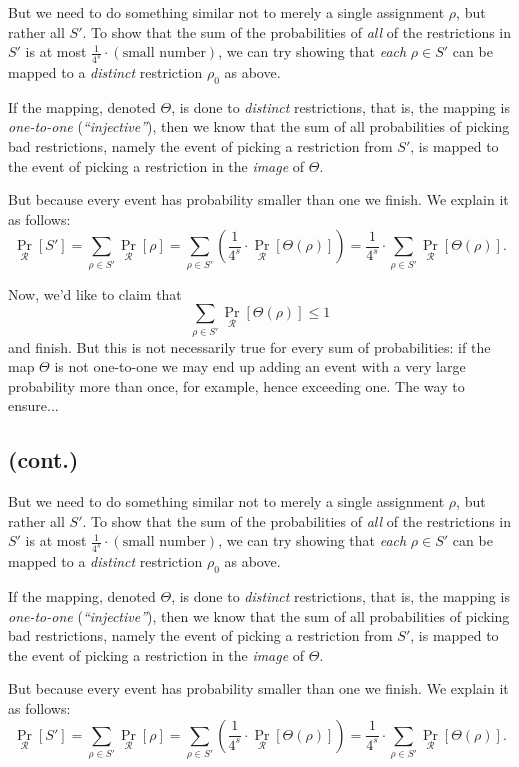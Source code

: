 But we need to do something similar not to merely a single assignment \( \rho \), but rather all \( S' \).
To show that the sum of the probabilities of \emph{all} of the restrictions in \( S' \) is at most 
\(\frac{1}{4^s} \cdot (\text{small number})\), we can try showing that \emph{each} \( \rho \in S' \) can be mapped to a 
\emph{distinct} restriction \( \rho_0 \) as above. 

If the mapping, denoted \( \Theta \), is done to \emph{distinct} restrictions, that is, the mapping is 
\emph{one-to-one} (\emph{``injective''}), then we know that the sum of all probabilities of picking bad restrictions, 
namely the event of picking a restriction from \( S' \), is mapped to the event of picking a restriction in the 
\emph{image} of \( \Theta \).

But because every event has probability smaller than one we finish. We explain it as follows:
\[
\Pr_{\mathcal{R}}[S'] = \sum_{\rho \in S'} \Pr_{\mathcal{R}}[\rho] = 
\sum_{\rho \in S'} \left(\frac{1}{4^s} \cdot \Pr_{\mathcal{R}}[\Theta(\rho)]\right) =
\frac{1}{4^s} \cdot \sum_{\rho \in S'} \Pr_{\mathcal{R}}[\Theta(\rho)].
\]

Now, we'd like to claim that 
\[
\sum_{\rho \in S'} \Pr_{\mathcal{R}}[\Theta(\rho)] \leq 1
\]
and finish. But this is not necessarily true for every sum of probabilities: if the map \( \Theta \) is 
not one-to-one we may end up adding an event with a very large probability more than once, for example, 
hence exceeding one. The way to ensure...
\subsection*{(cont.)}

But we need to do something similar not to merely a single assignment \( \rho \), but rather all \( S' \).
To show that the sum of the probabilities of \emph{all} of the restrictions in \( S' \) is at most 
\(\frac{1}{4^s} \cdot (\text{small number})\), we can try showing that \emph{each} \( \rho \in S' \) can be mapped to a 
\emph{distinct} restriction \( \rho_0 \) as above. 

If the mapping, denoted \( \Theta \), is done to \emph{distinct} restrictions, that is, the mapping is 
\emph{one-to-one} (\emph{``injective''}), then we know that the sum of all probabilities of picking bad restrictions, 
namely the event of picking a restriction from \( S' \), is mapped to the event of picking a restriction in the 
\emph{image} of \( \Theta \).

But because every event has probability smaller than one we finish. We explain it as follows:
\[
\Pr_{\mathcal{R}}[S'] = \sum_{\rho \in S'} \Pr_{\mathcal{R}}[\rho] = 
\sum_{\rho \in S'} \left(\frac{1}{4^s} \cdot \Pr_{\mathcal{R}}[\Theta(\rho)]\right) =
\frac{1}{4^s} \cdot \sum_{\rho \in S'} \Pr_{\mathcal{R}}[\Theta(\rho)].
\]

